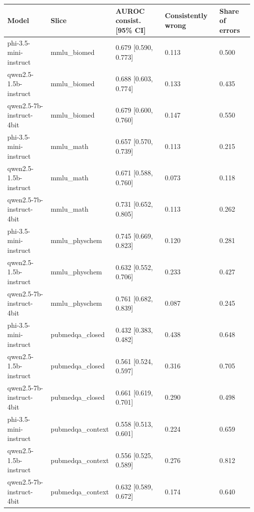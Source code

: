 \begin{tabular}{lllll}
\toprule
Model & Slice & AUROC consist. [95\% CI] & Consistently wrong & Share of errors \\
\midrule
phi-3.5-mini-instruct & mmlu\_biomed & 0.679 [0.590, 0.773] & 0.113 & 0.500 \\
qwen2.5-1.5b-instruct & mmlu\_biomed & 0.688 [0.603, 0.774] & 0.133 & 0.435 \\
qwen2.5-7b-instruct-4bit & mmlu\_biomed & 0.679 [0.600, 0.760] & 0.147 & 0.550 \\
phi-3.5-mini-instruct & mmlu\_math & 0.657 [0.570, 0.739] & 0.113 & 0.215 \\
qwen2.5-1.5b-instruct & mmlu\_math & 0.671 [0.588, 0.760] & 0.073 & 0.118 \\
qwen2.5-7b-instruct-4bit & mmlu\_math & 0.731 [0.652, 0.805] & 0.113 & 0.262 \\
phi-3.5-mini-instruct & mmlu\_physchem & 0.745 [0.669, 0.823] & 0.120 & 0.281 \\
qwen2.5-1.5b-instruct & mmlu\_physchem & 0.632 [0.552, 0.706] & 0.233 & 0.427 \\
qwen2.5-7b-instruct-4bit & mmlu\_physchem & 0.761 [0.682, 0.839] & 0.087 & 0.245 \\
phi-3.5-mini-instruct & pubmedqa\_closed & 0.432 [0.383, 0.482] & 0.438 & 0.648 \\
qwen2.5-1.5b-instruct & pubmedqa\_closed & 0.561 [0.524, 0.597] & 0.316 & 0.705 \\
qwen2.5-7b-instruct-4bit & pubmedqa\_closed & 0.661 [0.619, 0.701] & 0.290 & 0.498 \\
phi-3.5-mini-instruct & pubmedqa\_context & 0.558 [0.513, 0.601] & 0.224 & 0.659 \\
qwen2.5-1.5b-instruct & pubmedqa\_context & 0.556 [0.525, 0.589] & 0.276 & 0.812 \\
qwen2.5-7b-instruct-4bit & pubmedqa\_context & 0.632 [0.589, 0.672] & 0.174 & 0.640 \\
\bottomrule
\end{tabular}
